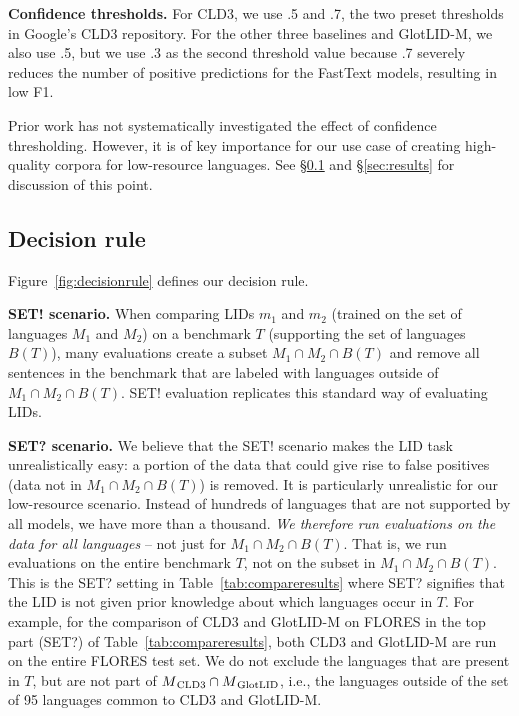 \documentclass[11pt]{article}
\newcommand{\basequ}{SET?\xspace}
\newcommand{\baseex}{SET!\xspace}
\def\dnrm#1{\mbox{$_{\hbox{\scriptsize #1}}$}}
\def\modelname{\mbox{GlotLID-M}\xspace}
\def\flores{FLORES\xspace}
\def\figref#1{Figure~\ref{fig:#1}}
\def\tabref#1{Table~\ref{tab:#1}}
\def\seclabel#1{\label{sec:#1}\label{p:#1}}
\def\secref#1{\S\ref{sec:#1}}
\begin{document}
\textbf{Confidence thresholds.} For CLD3, we use
.5 and .7,
the two preset thresholds in Google's CLD3 repository.
For the other three baselines and \modelname, we also use
.5, but we use .3 as the second threshold value because .7
severely reduces the number of positive predictions for the
FastText models, resulting in low F1.

Prior work has not systematically
investigated the effect of confidence thresholding. However, it is of key
importance for our
use case of creating high-quality corpora for low-resource
languages. See \secref{result-scenario}
and \secref{results} for discussion of this point.


\subsection{Decision rule}\seclabel{result-scenario}
\figref{decisionrule} defines our decision rule.



\textbf{\baseex scenario.} When comparing LIDs $m_1$
and $m_2$ (trained on the set of languages $M_1$ and $M_2$)
on a benchmark $T$ (supporting the set of languages $B(T)$),
many evaluations  create a  subset
$M_1 \cap M_2 \cap B(T)$ and remove all sentences in the
benchmark that are labeled with languages outside of
$M_1 \cap M_2 \cap B(T)$.
\baseex evaluation
replicates this standard way of evaluating LIDs.


\textbf{\basequ scenario.} 
We believe that the \baseex scenario makes the LID task
unrealistically easy: a portion of the
data that could give rise to false positives
(data   not in $M_1 \cap M_2 \cap B(T)$)
is removed.
It is particularly unrealistic for our low-resource
scenario. Instead of hundreds of languages that are not
supported by all models, we have
more than a thousand. \emph{We therefore run
evaluations on the data for all languages} -- not just for
$M_1 \cap M_2 \cap B(T)$. That
is, we run evaluations on the entire benchmark $T$, not on
the subset in $M_1 \cap M_2 \cap B(T)$.
This is the \basequ setting in \tabref{compareresults} where
\basequ signifies that the LID is not given prior knowledge
about which languages occur in $T$.
For example, for the comparison of CLD3 and \modelname on \flores
in the top part (\basequ) of \tabref{compareresults}, both CLD3 and \modelname are run on
the entire \flores test set. We do not exclude
the languages that are present in $T$, but are not part of $M\dnrm{CLD3} \cap M\dnrm{GlotLID}$,
i.e., the languages
outside of the set of 95 languages common to CLD3 and
\modelname.
\end{document}
